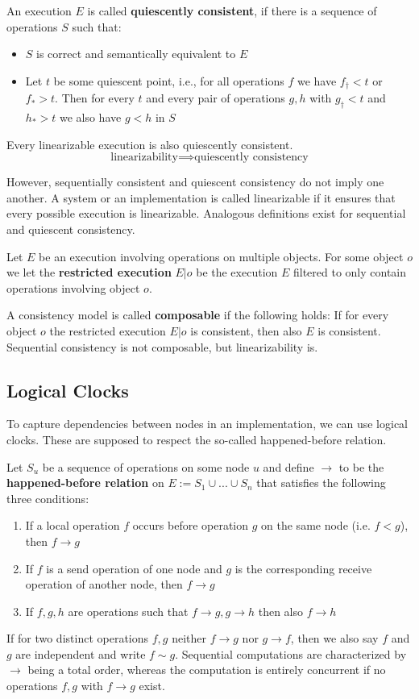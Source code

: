 An execution $E$ is called \textbf{quiescently consistent}, if there is a sequence of operations $S$ such that:
\begin{itemize}
	\item $S$ is correct and semantically equivalent to $E$
	\item Let $t$ be some quiescent point, i.e., for all operations $f$ we have $f_\dagger < t$ or $f_* > t$. Then for every $t$ and every pair of operations $g, h$ with $g_\dagger < t$ and $h_* > t$ we also have $g<h$ in $S$
\end{itemize}
Every linearizable execution is also quiescently consistent.
$$\text{linearizability} \implies \text{quiescently consistency}$$

However, sequentially consistent and quiescent consistency do not imply one another. A system or an implementation is called linearizable if it ensures that every possible execution is linearizable. Analogous definitions exist for sequential and quiescent consistency. \medskip

Let $E$ be an execution involving operations on multiple objects. For some object $o$ we let the \textbf{restricted execution} $E|o$ be the execution $E$ filtered to only contain operations involving object $o$. \medskip

A consistency model is called \textbf{composable} if the following holds: If for every object $o$ the restricted execution $E|o$ is consistent, then also $E$ is consistent. Sequential consistency is not composable, but linearizability is.


\subsection{Logical Clocks}

To capture dependencies between nodes in an implementation, we can use logical clocks. These are supposed to respect the so-called happened-before relation. \medskip

Let $S_u$ be a sequence of operations on some node $u$ and define $\to$ to be the \textbf{happened-before relation} on $E := S_1 \cup ... \cup S_n$ that satisfies the following three conditions:
\begin{enumerate}
	\item If a local operation $f$ occurs before operation $g$ on the same node (i.e. $f < g$), then $f \to g$
	\item If $f$ is a send operation of one node and $g$ is the corresponding receive operation of another node, then $f \to g$
	\item If $f, g, h$ are operations such that $f \to g, g \to h$ then also $f \to h$
\end{enumerate}
If for two distinct operations $f,g$ neither $f \to g$ nor $g \to f$, then we also say $f$ and $g$ are independent and write $f \sim g$. Sequential computations are characterized by $\to$ being a total order, whereas the computation is entirely concurrent if no operations $f,g$ with $f \to g$ exist. \medskip

